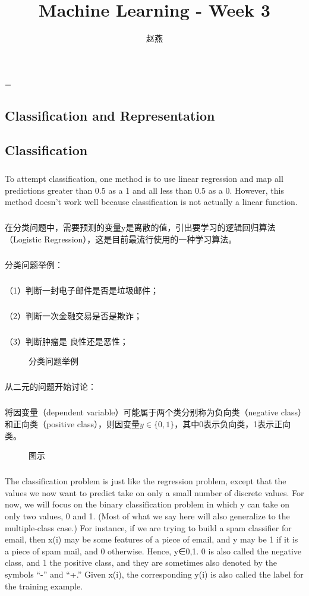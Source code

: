 \documentclass{article}
\title{Machine Learning - Week 3}
\author{赵燕}
\date{}
\begin{document}
 
\hfuzz=\maxdimen
{}
\begin{CJK}{UTF8}{gbsn} 
\maketitle
\renewcommand\contentsname{目录}
\renewcommand\figurename{图}
\tableofcontents
\newpage

\section{Classification and Representation}
\subsection{Classification}
\subparagraph{}
To attempt classification, one method is to use linear regression and map all predictions greater than 0.5 as a 1 and all less than 0.5 as a 0. However, this method doesn't work well because classification is not actually a linear function.
\subparagraph{}
在分类问题中，需要预测的变量y是离散的值，引出要学习的逻辑回归算法（Logistic Regression），这是目前最流行使用的一种学习算法。
\subparagraph{}
分类问题举例：
\subparagraph{}
（1）判断一封电子邮件是否是垃圾邮件；
\subparagraph{}
（2）判断一次金融交易是否是欺诈；
\subparagraph{}
（3）判断肿瘤是 良性还是恶性；
\begin{figure}[H]
\caption{分类问题举例}
\label{fig:301}
\end{figure}
\subparagraph{}
从二元的问题开始讨论：
\subparagraph{}
将因变量（dependent variable）可能属于两个类分别称为负向类（negative class）和正向类（positive class），则因变量$y\in{\{0,1}\}$，其中0表示负向类，1表示正向类。
\begin{figure}[H]
\caption{图示}
\label{fig:302}
\end{figure}
\subparagraph{}
The classification problem is just like the regression problem, except that the values we now want to predict take on only a small number of discrete values. For now, we will focus on the binary classification problem in which y can take on only two values, 0 and 1. (Most of what we say here will also generalize to the multiple-class case.) For instance, if we are trying to build a spam classifier for email, then x(i) may be some features of a piece of email, and y may be 1 if it is a piece of spam mail, and 0 otherwise. Hence, y∈{0,1}. 0 is also called the negative class, and 1 the positive class, and they are sometimes also denoted by the symbols “-” and “+.” Given x(i), the corresponding y(i) is also called the label for the training example.

\end{CJK}
\end{document}
